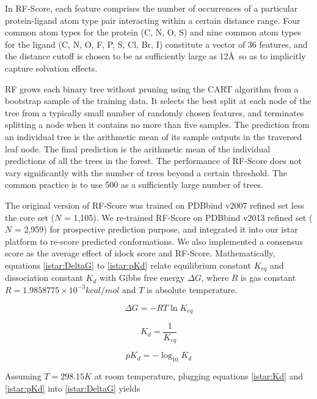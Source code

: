 In RF-Score, each feature comprises the number of occurrences of a particular protein-ligand atom type pair interacting within a certain distance range. Four common atom types for the protein (C, N, O, S) and nine common atom types for the ligand (C, N, O, F, P, S, Cl, Br, I) constitute a vector of 36 features, and the distance cutoff is chosen to be as sufficiently large as 12\AA\ so as to implicitly capture solvation effects.

RF grows each binary tree without pruning using the CART algorithm \citep{1310} from a bootstrap sample of the training data. It selects the best split at each node of the tree from a typically small number of randomly chosen features, and terminates splitting a node when it contains no more than five samples. The prediction from an individual tree is the arithmetic mean of its sample outputs in the traversed leaf node. The final prediction is the arithmetic mean of the individual predictions of all the trees in the forest. The performance of RF-Score does not vary significantly with the number of trees beyond a certain threshold. The common practice is to use 500 as a sufficiently large number of trees.

The original version of RF-Score \citep{564} was trained on PDBbind v2007 refined set less the core set ($N$ = 1,105). We re-trained RF-Score on PDBbind v2013 refined set ($N$ = 2,959) for prospective prediction purpose, and integrated it into our istar platform to re-score predicted conformations. We also implemented a consensus score as the average effect of idock score and RF-Score. Mathematically, equations \eqref{istar:DeltaG} to \eqref{istar:pKd} relate equilibrium constant $K_{eq}$ and dissociation constant $K_d$ with Gibbs free energy $\Delta G$, where $R$ is gas constant $R = 1.9858775 \times 10^{-3} kcal/mol$ and $T$ is absolute temperature.

\begin{equation}
\label{istar:DeltaG}
\Delta G = -RT\ln K_{eq}
\end{equation}

\begin{equation}
\label{istar:Kd}
K_d = \frac{1}{K_{eq}}
\end{equation}

\begin{equation}
\label{istar:pKd}
pK_d = -\log_{10} K_d
\end{equation}

Assuming $T = 298.15K$ at room temperature, plugging equations \eqref{istar:Kd} and \eqref{istar:pKd} into \eqref{istar:DeltaG} yields

